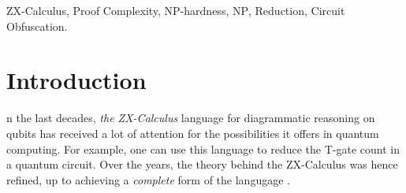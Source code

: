 \documentclass[journal,onecolumn]{IEEEtran}
\begin{document}







\maketitle

\begin{abstract}
The abstract goes here.
\end{abstract}

\begin{IEEEkeywords}
ZX-Calculus, Proof Complexity, \textsc{NP}-hardness, \textsc{NP}, Reduction, Circuit Obfuscation.
\end{IEEEkeywords}






%
\IEEEpeerreviewmaketitle



\section{Introduction}
% 
% 
% 
% 
n the last decades, \textit{the ZX-Calculus} language for diagrammatic reasoning on qubits has received a lot of attention for the possibilities it offers in quantum computing. For example, one can use this language to reduce the T-gate count in a quantum circuit. Over the years, the theory behind the ZX-Calculus was hence refined, up to achieving a \textit{complete} form of the langugage \cite{ZXcompleteness}.
\end{document}
